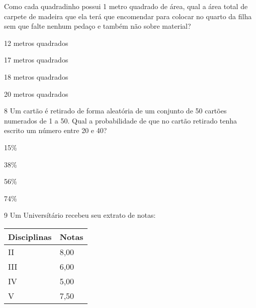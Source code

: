 Como cada quadradinho possui 1 metro quadrado de área, qual a área total
de carpete de madeira que ela terá que encomendar para colocar no quarto
da filha sem que falte nenhum pedaço e também não sobre material?

\begin{escolha}
\item
  12 metros quadrados
\item
  17 metros quadrados
\item
  18 metros quadrados
\item
  20 metros quadrados
\end{escolha}


\num{8} Um cartão é retirado de forma aleatória de um conjunto de 50
cartões numerados de 1 a 50. Qual a probabilidade de que no cartão
retirado tenha escrito um número entre 20 e 40?

\begin{escolha}
\item
  15\%
\item
  38\%
\item
  56\%
\item
  74\%
\end{escolha}


\num{9} Um Universítário recebeu seu extrato de notas:


\begin{longtable}[]{@{}ll@{}}
\toprule
Disciplinas & Notas\tabularnewline
\midrule
\endhead
II & 8,00\tabularnewline
III & 6,00\tabularnewline
IV & 5,00\tabularnewline
V & 7,50\tabularnewline
\bottomrule
\end{longtable}

